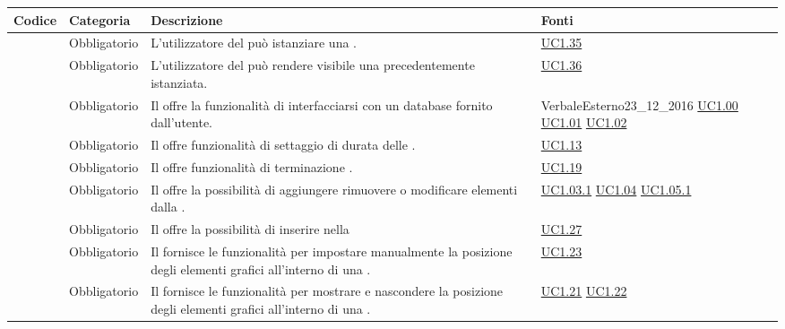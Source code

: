 \begin{longtable}{|P{1.5cm}|P{2.5cm}|P{6.5cm}|P{2.5cm}|}
	\hline \textbf{Codice} & \textbf{Categoria} & \textbf{Descrizione} & \textbf{Fonti} \\
	\hline \RequisitoObF\label{L6} & Obbligatorio & L'utilizzatore del  può istanziare una . & \hyperref[UC1.35]{UC1.35} \\
	\hline \RequisitoObF\label{L7} & Obbligatorio & L'utilizzatore del  può rendere visibile una  precedentemente istanziata. & \hyperref[UC1.36]{UC1.36} \\
	\hline \RequisitoObF\label{L8} & Obbligatorio & Il  offre la funzionalità di interfacciarsi con un database  fornito dall'utente. & VerbaleEsterno23\_12\_2016 \linebreak \hyperref[UC1.00]{UC1.00} \linebreak \hyperref[UC1.01]{UC1.01} \hyperref[UC1.02]{UC1.02} \\
	\hline \RequisitoObF\label{L9} & Obbligatorio & Il  offre funzionalità di settaggio di durata delle . & \hyperref[UC1.13]{UC1.13} \\
	\hline \RequisitoObF\label{L10} & Obbligatorio & Il  offre funzionalità di terminazione . & \hyperref[UC1.19]{UC1.19} \\
	\hline \RequisitoObF\label{L11} & Obbligatorio & Il  offre la possibilità di aggiungere rimuovere o modificare elementi dalla . & \hyperref[UC1.03.1]{UC1.03.1} \hyperref[UC1.04]{UC1.04} \hyperref[UC1.05.1]{UC1.05.1} \\
	\hline \RequisitoObF\label{L12} & Obbligatorio & Il  offre la possibilità di inserire  nella  & \hyperref[UC1.27]{UC1.27} \\
	\hline \RequisitoObF\label{L13} & Obbligatorio & Il  fornisce le funzionalità per impostare manualmente la posizione degli elementi grafici all'interno di una . & \hyperref[UC1.23]{UC1.23} \\
	\hline \RequisitoObF\label{L14} & Obbligatorio & Il  fornisce le funzionalità per mostrare e nascondere la posizione degli elementi grafici all'interno di una . & \hyperref[UC1.21]{UC1.21} \linebreak \hyperref[UC1.22]{UC1.22} \\

\end{longtable}
